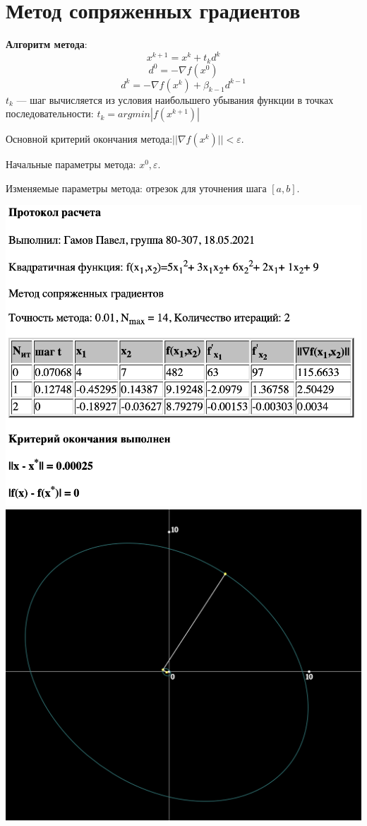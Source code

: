 \section{Метод сопряженных градиентов}

\textbf{Алгоритм метода}:
$$ x^{k+1} = x^{k} + t_{k}d^{k}$$
$$ d^{0} = - \nabla f(x^{0})$$
$$ d^{k} = - \nabla f(x^{k}) + \beta_{k - 1}d^{k - 1}$$
$t_{k}$ --- шаг вычисляется из условия наибольшего убывания функции в точках последовательности: $t_{k} = argmin|f(x^{k+1})|$

Основной критерий окончания метода:$|| \nabla f(x^{k})|| < \varepsilon$.

Начальные параметры метода: $x^{0}, \varepsilon$.

Изменяемые параметры метода: отрезок для уточнения шага $[a, b]$.

\includegraphics[width=0.8\linewidth]{images/1_prot}\\
\includegraphics[width=0.6\linewidth]{images/1_graf}\\

